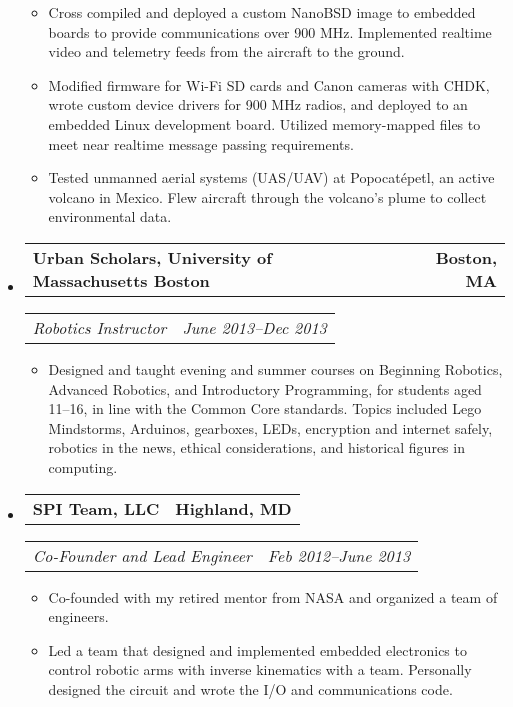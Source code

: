 \documentclass[10pt,letterpaper]{article}
\newcommand{\headerrow}[2]{%
    \begin{tabularx}{\linewidth}{Xr}
	    #1 & #2 \\
    \end{tabularx}
}
\begin{document}
\begin{itemize}
\begin{itemize}
        \item Cross compiled and deployed a custom NanoBSD image to embedded
            boards to provide communications over 900 MHz.  Implemented
            realtime video and telemetry feeds from the aircraft to the ground.

        \item Modified firmware for Wi-Fi SD cards and Canon cameras with CHDK,
            wrote custom device drivers for 900 MHz radios, and deployed to an
            embedded Linux development board.  Utilized memory-mapped files to
            meet near realtime message passing requirements.

        \item Tested unmanned aerial systems (UAS/UAV) at Popocatépetl, an active
            volcano in Mexico. Flew aircraft through the volcano's plume to
            collect environmental data.
    \end{itemize}

    \item
    \headerrow{\textbf{Urban Scholars, University of Massachusetts Boston}}
		{\textbf{Boston, MA}}
	\headerrow{\textit{Robotics Instructor}}{\textit{June 2013--Dec 2013}}
	\begin{itemize}
        \item Designed and taught evening and summer courses on Beginning
            Robotics, Advanced Robotics, and Introductory Programming, for
            students aged 11--16, in line with the Common Core standards.
            Topics included Lego Mindstorms, Arduinos, gearboxes, LEDs,
            encryption and internet safely, robotics in the news, ethical
            considerations, and historical figures in computing.
	\end{itemize}

	\item
	\headerrow{\textbf{SPI Team, LLC}}{\textbf{Highland, MD}}
	\headerrow{\textit{Co-Founder and Lead Engineer}}
		{\textit{Feb 2012--June 2013}}
	\begin{itemize}
        \item Co-founded with my retired mentor from NASA and organized a team
            of engineers.

        \item Led a team that designed and implemented embedded electronics to
            control robotic arms with inverse kinematics with a team.
            Personally designed the circuit and wrote the I/O and
            communications code.


\end{itemize}
\end{itemize}
\end{document}
